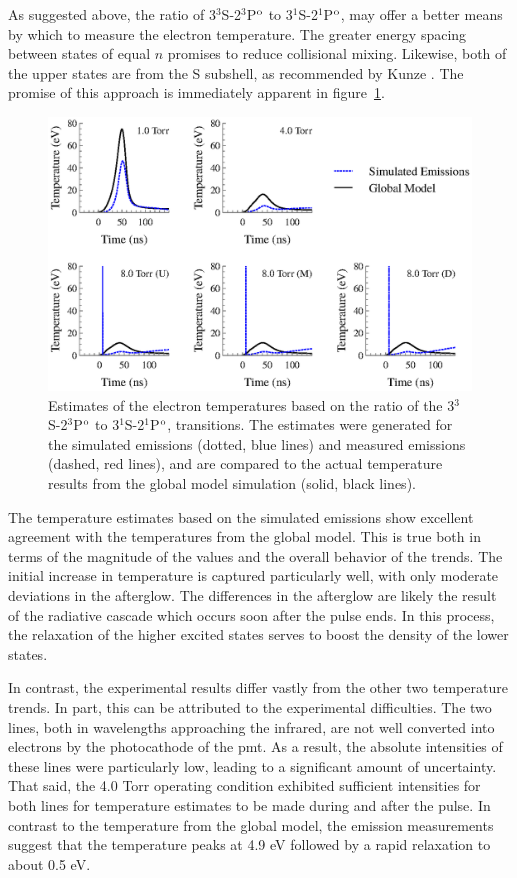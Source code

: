 As suggested above, the ratio of 3$^3$S-2$^3$P$^\mathrm{o}$ to 3$^1$S-2$^1$P$^\mathrm{o}$, may
offer a better means by which to measure the electron temperature. The greater
energy spacing between states of equal $n$ promises to reduce collisional
mixing. Likewise, both of the upper states are from the S subshell, as
recommended by Kunze \cite{Kunze2009}. The promise of this approach is
immediately apparent in figure~\ref{fig:rat1comp}.
\begin{figure}
  \centering
  \includegraphics{./chapters/emissions/figures/rat1comp.eps}
  \caption{Estimates of the electron temperatures based on the ratio of the
    3$^3$S-2$^3$P$^\mathrm{o}$ to 3$^1$S-2$^1$P$^\mathrm{o}$, transitions. The estimates were
    generated for the simulated emissions (dotted, blue lines) and measured
    emissions (dashed, red lines), and are compared to the actual temperature
    results from the global model simulation (solid, black lines).}
  \label{fig:rat1comp}
\end{figure}
The temperature estimates based on the simulated emissions show excellent
agreement with the temperatures from the global model. This is true both in
terms of the magnitude of the values and the overall behavior of the trends.
The initial increase in temperature is captured particularly well, with only
moderate deviations in the afterglow. The differences in the afterglow are
likely the result of the radiative cascade which occurs soon after the pulse
ends. In this process, the relaxation of the higher excited states serves to
boost the density of the lower states.

In contrast, the experimental results differ vastly from the other two
temperature trends. In part, this can be attributed to the experimental
difficulties. The two lines, both in wavelengths approaching the infrared, are
not well converted into electrons by the photocathode of the \acs{pmt}. As a
result, the absolute intensities of these lines were particularly low, leading
to a significant amount of uncertainty. That said, the 4.0 Torr operating
condition exhibited sufficient intensities for both lines for temperature
estimates to be made during and after the pulse. In contrast to the temperature
from the global model, the emission measurements suggest that the temperature
peaks at 4.9 eV followed by a rapid relaxation to about 0.5 eV.

